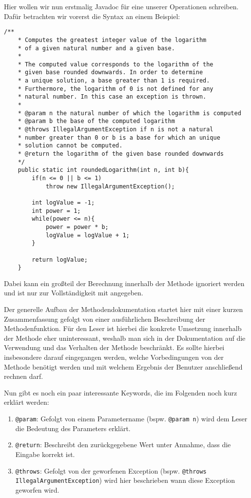 \begin{Infobox}[Javadoc]
    Hier wollen wir nun erstmalig Javadoc für eine unserer Operationen schreiben. 
    Dafür betrachten wir vorerst die Syntax an einem Beispiel:

    \begin{lstlisting}[numbers=none]
    /**
    * Computes the greatest integer value of the logarithm 
    * of a given natural number and a given base. 
    * 
    * The computed value corresponds to the logarithm of the
    * given base rounded downwards. In order to determine
    * a unique solution, a base greater than 1 is required.
    * Furthermore, the logarithm of 0 is not defined for any 
    * natural number. In this case an exception is thrown.
    * 
    * @param n the natural number of which the logarithm is computed
    * @param b the base of the computed logarithm
    * @throws IllegalArgumentException if n is not a natural
    * number greater than 0 or b is a base for which an unique
    * solution cannot be computed.
    * @return the logarithm of the given base rounded downwards
    */
    public static int roundedLogarithm(int n, int b){
        if(n <= 0 || b <= 1)
            throw new IllegalArgumentException();
        
        int logValue = -1;
        int power = 1;
        while(power <= n){
            power = power * b;
            logValue = logValue + 1;
        }

        return logValue;
    }
    \end{lstlisting}

    Dabei kann ein großteil der Berechnung innerhalb der Methode ignoriert werden und ist nur zur Vollständigkeit mit angegeben.
    
    Der generelle Aufbau der Methodendokumentation startet hier mit einer kurzen Zusammenfassung gefolgt von einer ausführlichen Beschreibung der Methodenfunktion. 
    Für den Leser ist hierbei die konkrete Umsetzung innerhalb der Methode eher uninteressant, weshalb man sich in der Dokumentation auf die Verwendung und das Verhalten der Methode beschränkt. 
    Es sollte hierbei insbesondere darauf eingegangen werden, welche Vorbedingungen von der Methode benötigt werden und mit welchem Ergebnis der Benutzer anschließend rechnen darf.

    Nun gibt es noch ein paar interessante Keywords, die im Folgenden noch kurz erklärt werden:

    \begin{enumerate}[label=\roman*)]
        \item \lstinline{@param}: 
            Gefolgt von einem Parametername (bspw. \lstinline{@param n}) wird dem Leser die Bedeutung des Parameters erklärt.
        \item \lstinline{@return}: 
            Beschreibt den zurückgegebene Wert unter Annahme, dass die Eingabe korrekt ist.
        \item \lstinline{@throws}: 
        Gefolgt von der geworfenen Exception (bspw. \lstinline{@throws IllegalArgumentException}) wird hier beschrieben wann diese Exception geworfen wird.
    \end{enumerate}
\end{Infobox}


